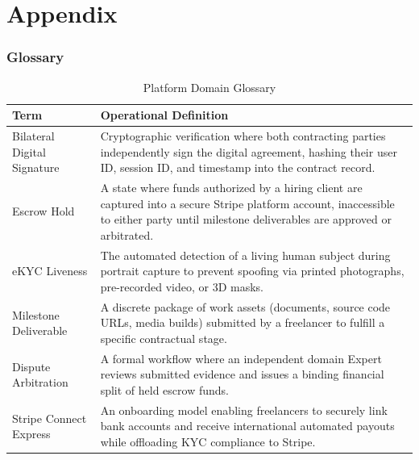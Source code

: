 \part{Appendix}

\section{Glossary}
\begin{table}[H]
\centering
\caption{Platform Domain Glossary}
\label{tab:glossary}
\renewcommand{\arraystretch}{1.25}
\setlength{\tabcolsep}{6pt}
\small
\begin{tabular}{|L{3.8cm}|L{11.0cm}|}
\hline
{}
\textbf{Term} & \textbf{Operational Definition} \\
\hline
Bilateral Digital Signature & Cryptographic verification where both contracting parties independently sign the digital agreement, hashing their user ID, session ID, and timestamp into the contract record. \\
\hline
Escrow Hold & A state where funds authorized by a hiring client are captured into a secure Stripe platform account, inaccessible to either party until milestone deliverables are approved or arbitrated. \\
\hline
eKYC Liveness & The automated detection of a living human subject during portrait capture to prevent spoofing via printed photographs, pre-recorded video, or 3D masks. \\
\hline
Milestone Deliverable & A discrete package of work assets (documents, source code URLs, media builds) submitted by a freelancer to fulfill a specific contractual stage. \\
\hline
Dispute Arbitration & A formal workflow where an independent domain Expert reviews submitted evidence and issues a binding financial split of held escrow funds. \\
\hline
Stripe Connect Express & An onboarding model enabling freelancers to securely link bank accounts and receive international automated payouts while offloading KYC compliance to Stripe. \\
\hline
\end{tabular}
\end{table}

